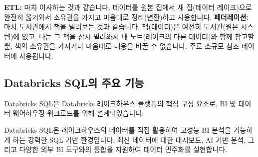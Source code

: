 \documentclass[11pt,a4paper]{article}
\begin{document}
\begin{tcolorbox}[myexample={페더레이션과 ETL의 차이}]
\textbf{ETL:} 마치 이사하는 것과 같습니다. 데이터를 원본 집에서 새 집(데이터 레이크)으로 완전히 옮겨와서 소유권을 가지고 마음대로 정리(변환)하고 사용합니다.
\textbf{페더레이션:} 마치 도서관에서 책을 빌려보는 것과 같습니다. 책(데이터)은 여전히 도서관(원본 시스템)에 있고, 나는 그 책을 잠시 빌려와서 내 노트(레이크의 다른 데이터)와 함께 참고할 뿐, 책의 소유권을 가지거나 마음대로 내용을 바꿀 수 없습니다. 주로 소규모 참조 데이터에 사용됩니다.
\end{tcolorbox}

\subsection{Databricks SQL의 주요 기능}
Databricks SQL은 Databricks 레이크하우스 플랫폼의 핵심 구성 요소로, BI 및 데이터 웨어하우징 워크로드를 위해 설계되었습니다.

\begin{tcolorbox}[mybox={핵심 요약: 레이크하우스의 BI 엔진}]
Databricks SQL은 레이크하우스의 데이터를 직접 활용하여 고성능 BI 분석을 가능하게 하는 강력한 SQL 기반 환경입니다. 최신 데이터에 대한 대시보드, AI 기반 분석, 그리고 다양한 외부 BI 도구와의 통합을 지원하여 데이터 민주화를 실현합니다.
\end{tcolorbox}
\end{document}
